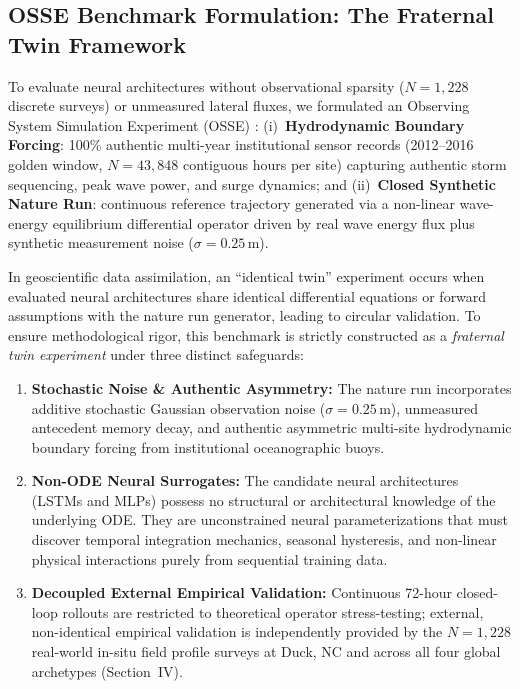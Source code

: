 \documentclass[journal]{IEEEtran}
\begin{document}
\subsection{OSSE Benchmark Formulation: The Fraternal Twin Framework}
To evaluate neural architectures without observational sparsity ($N = 1,228$ discrete surveys) or unmeasured lateral fluxes, we formulated an Observing System Simulation Experiment (OSSE) \cite{atlas1997osse}: (i)~\textbf{Hydrodynamic Boundary Forcing}: 100\% authentic multi-year institutional sensor records (2012--2016 golden window, $N = 43,848$ contiguous hours per site) capturing authentic storm sequencing, peak wave power, and surge dynamics; and (ii)~\textbf{Closed Synthetic Nature Run}: continuous reference trajectory generated via a non-linear wave-energy equilibrium differential operator \cite{yates2009equilibrium} driven by real wave energy flux plus synthetic measurement noise ($\sigma = 0.25\,\text{m}$).

In geoscientific data assimilation, an ``identical twin'' experiment occurs when evaluated neural architectures share identical differential equations or forward assumptions with the nature run generator, leading to circular validation. To ensure methodological rigor, this benchmark is strictly constructed as a \emph{fraternal twin experiment} under three distinct safeguards:
\begin{enumerate}
    \item \textbf{Stochastic Noise \& Authentic Asymmetry:} The nature run incorporates additive stochastic Gaussian observation noise ($\sigma = 0.25\,\text{m}$), unmeasured antecedent memory decay, and authentic asymmetric multi-site hydrodynamic boundary forcing from institutional oceanographic buoys.
    \item \textbf{Non-ODE Neural Surrogates:} The candidate neural architectures (LSTMs and MLPs) possess no structural or architectural knowledge of the underlying ODE. They are unconstrained neural parameterizations that must discover temporal integration mechanics, seasonal hysteresis, and non-linear physical interactions purely from sequential training data.
    \item \textbf{Decoupled External Empirical Validation:} Continuous 72-hour closed-loop rollouts are restricted to theoretical operator stress-testing; external, non-identical empirical validation is independently provided by the $N = 1{,}228$ real-world in-situ field profile surveys at Duck, NC and across all four global archetypes (Section~IV).
\end{enumerate}
\end{document}
